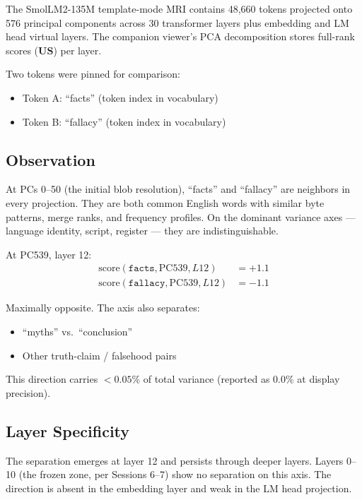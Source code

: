 \documentclass[11pt,a4paper]{article}
\begin{document}
The SmolLM2-135M template-mode MRI contains 48,660 tokens projected onto 576 principal components across 30 transformer layers plus embedding and LM head virtual layers. The companion viewer's PCA decomposition stores full-rank scores ($\mathbf{U} \mathbf{S}$) per layer.

Two tokens were pinned for comparison:
\begin{itemize}[nosep]
  \item Token A: ``facts'' (token index in vocabulary)
  \item Token B: ``fallacy'' (token index in vocabulary)
\end{itemize}

\subsection{Observation}

At PCs 0--50 (the initial blob resolution), ``facts'' and ``fallacy'' are neighbors in every projection. They are both common English words with similar byte patterns, merge ranks, and frequency profiles. On the dominant variance axes --- language identity, script, register --- they are indistinguishable.

At PC539, layer 12:
\begin{align}
  \text{score}(\texttt{facts}, \text{PC539}, L12) &= +1.1 \\
  \text{score}(\texttt{fallacy}, \text{PC539}, L12) &= -1.1
\end{align}

Maximally opposite. The axis also separates:
\begin{itemize}[nosep]
  \item ``myths'' vs.\ ``conclusion''
  \item Other truth-claim / falsehood pairs
\end{itemize}

This direction carries $<0.05\%$ of total variance (reported as $0.0\%$ at display precision).

\subsection{Layer Specificity}

The separation emerges at layer 12 and persists through deeper layers. Layers 0--10 (the frozen zone, per Sessions 6--7) show no separation on this axis. The direction is absent in the embedding layer and weak in the LM head projection.
\end{document}
